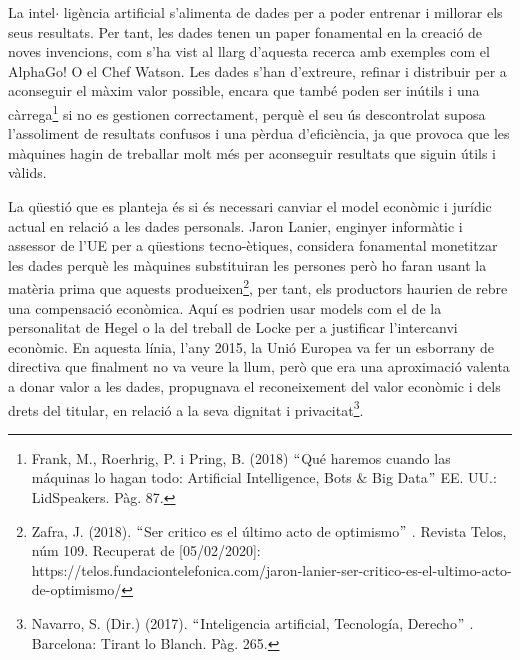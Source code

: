 \documentclass[12pt]{article}
\renewcommand{\_}{\kern-1.5pt\textunderscore\kern-1.5pt}
\begin{document}
\begin{itemize}
\vspace{\baselineskip}
\begin{justify}
La intel$ \cdot $ ligència artificial s’alimenta de dades per a poder entrenar i millorar els seus resultats. Per tant, les dades tenen un paper fonamental en la creació de noves invencions, com s’ha vist al llarg d’aquesta recerca amb exemples com el AlphaGo! O el Chef Watson. Les dades s’han d’extreure, refinar i distribuir per a aconseguir el màxim valor possible, encara que també poden ser inútils i una càrrega\footnote{ Frank, M., Roerhrig, P. i Pring, B. (2018) $``$Qué haremos cuando las máquinas lo hagan todo: Artificial Intelligence, Bots $\&$  Big Data$"$  EE. UU.: LidSpeakers. Pàg. 87. } si no es gestionen correctament, perquè el seu ús descontrolat suposa l’assoliment de resultats confusos i una pèrdua d’eficiència, ja que provoca que les màquines hagin de treballar molt més per aconseguir resultats que siguin útils i vàlids.
\end{justify}\par


\vspace{\baselineskip}
\begin{justify}
La qüestió que es planteja és si és necessari canviar el model econòmic i jurídic actual en relació a les dades personals. Jaron Lanier, enginyer informàtic i assessor de l’UE per a qüestions tecno-ètiques, considera fonamental monetitzar les dades perquè les màquines substituiran les persones però ho faran usant la matèria prima que aquests produeixen\footnote{ Zafra, J. (2018). $``$Ser critico es el último acto de optimismo$"$ . Revista Telos, núm 109. Recuperat de [05/02/2020]: https://telos.fundaciontelefonica.com/jaron-lanier-ser-critico-es-el-ultimo-acto-de-optimismo/ }, per tant, els productors haurien de rebre una compensació econòmica. Aquí es podrien usar models com el de la personalitat de Hegel o la del treball de Locke per a justificar l’intercanvi econòmic. En aquesta línia, l’any 2015, la Unió Europea va fer un esborrany de directiva que finalment no va veure la llum, però que era una aproximació valenta a donar valor a les dades, propugnava el reconeixement del valor econòmic i dels drets del titular, en relació a la seva dignitat i privacitat\footnote{ Navarro, S. (Dir.) (2017). $``$Inteligencia artificial, Tecnología, Derecho$"$ . Barcelona: Tirant lo Blanch. Pàg. 265.  }.
\end{justify}\par



\end{itemize}
\end{document}
